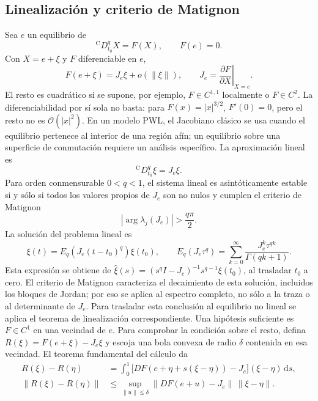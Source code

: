 \subsection{Linealización y criterio de Matignon}

Sea \(e\) un equilibrio de
\[
{}^{\mathrm C}D_{t_0}^{q}X=F(X),\qquad F(e)=0.
\]
Con \(X=e+\xi\) y \(F\) diferenciable en \(e\),
\[
F(e+\xi)=J_e\xi+o(\|\xi\|),
\qquad
J_e=\left.\frac{\partial F}{\partial X}\right|_{X=e}.
\]
El resto es cuadrático si se supone, por ejemplo, \(F\in C^{1,1}\) localmente
o \(F\in C^2\). La diferenciabilidad por sí sola no basta: para
\(F(x)=|x|^{3/2}\), \(F'(0)=0\), pero el resto no es
\(\mathcal O(|x|^2)\). En un modelo PWL, el Jacobiano clásico se usa cuando el
equilibrio pertenece al interior de una región afín; un equilibrio sobre una
superficie de conmutación requiere un análisis específico.
La aproximación lineal es
\begin{equation}
{}^{\mathrm C}D_{t_0}^{q}\xi=J_e\xi.
\label{eq:lineal_caputo}
\end{equation}
Para orden conmensurable \(0<q<1\), el sistema lineal es asintóticamente
estable si y sólo si todos los valores propios de \(J_e\) son no nulos y
cumplen el criterio de Matignon \cite{Matignon1996}
\begin{equation}
|\arg\lambda_j(J_e)|>\frac{q\pi}{2}.
\label{eq:matignon}
\end{equation}
La solución del problema lineal es
\[
 \xi(t)=E_q\!\left(J_e(t-t_0)^q\right)\xi(t_0),
 \qquad
 E_q(J_e\tau^q)=\sum_{k=0}^{\infty}
 \frac{J_e^k\tau^{qk}}{\Gamma(qk+1)}.
\]
Esta expresión se obtiene de
\(\widehat\xi(s)=(s^qI-J_e)^{-1}s^{q-1}\xi(t_0)\), al trasladar
\(t_0\) a cero. El criterio de Matignon caracteriza el decaimiento de
esta solución, incluidos los bloques de Jordan; por eso se aplica al
espectro completo, no sólo a la traza o al determinante de \(J_e\).
Para trasladar esta conclusión al equilibrio no lineal se aplica el teorema de
linealización correspondiente. Una hipótesis suficiente es \(F\in C^1\) en
una vecindad de \(e\). Para comprobar la condición sobre el resto, defina
\(R(\xi)=F(e+\xi)-J_e\xi\) y escoja una bola convexa de radio
\(\delta\) contenida en esa vecindad. El teorema fundamental del cálculo da
\begin{align*}
 R(\xi)-R(\eta)
 &=\int_0^1\bigl[DF(e+\eta+s(\xi-\eta))-J_e\bigr]
                (\xi-\eta)\,\mathrm ds,\\
 \|R(\xi)-R(\eta)\|
 &\leq\sup_{\|u\|\leq\delta}\|DF(e+u)-J_e\|\,
          \|\xi-\eta\|.
\end{align*}
